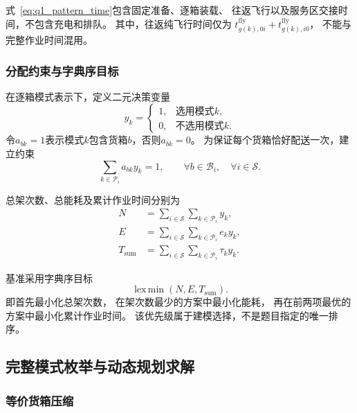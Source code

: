\documentclass[bwprint]{gmcmthesis}
\begin{document}
式~\eqref{eq:q1_pattern_time}包含固定准备、逐箱装载、
往返飞行以及服务区交接时间，不包含充电和排队。
其中，往返纯飞行时间仅为
$t_{g(k),0i}^{\mathrm{fly}}+t_{g(k),i0}^{\mathrm{fly}}$，
不能与完整作业时间混用。

\subsubsection{分配约束与字典序目标}

在逐箱模式表示下，定义二元决策变量
\begin{equation}
    y_k=
    \begin{cases}
        1,&\text{选用模式}k,\\
        0,&\text{不选用模式}k.
    \end{cases}
\end{equation}
令$a_{bk}=1$表示模式$k$包含货箱$b$，否则$a_{bk}=0$。
为保证每个货箱恰好配送一次，建立约束
\begin{equation}
    \sum_{k\in\mathcal{P}_i}a_{bk}y_k=1,
    \qquad
    \forall b\in\mathcal{B}_i,\quad
    \forall i\in\mathcal{S}.
\label{eq:q1_exact_assignment}
\end{equation}

总架次数、总能耗及累计作业时间分别为
\begin{align}
    N&=\sum_{i\in\mathcal{S}}
       \sum_{k\in\mathcal{P}_i}y_k,\\
    E&=\sum_{i\in\mathcal{S}}
       \sum_{k\in\mathcal{P}_i}e_k y_k,\\
    T_{\mathrm{sum}}
      &=\sum_{i\in\mathcal{S}}
       \sum_{k\in\mathcal{P}_i}\tau_k y_k.
\end{align}

基准采用字典序目标
\begin{equation}
    \operatorname{lex\,min}
    \left(N,E,T_{\mathrm{sum}}\right).
\label{eq:q1_lex_objective}
\end{equation}
即首先最小化总架次数，
在架次数最少的方案中最小化能耗，
再在前两项最优的方案中最小化累计作业时间。
该优先级属于建模选择，不是题目指定的唯一排序。

\subsection{完整模式枚举与动态规划求解}

\subsubsection{等价货箱压缩}
\end{document}
